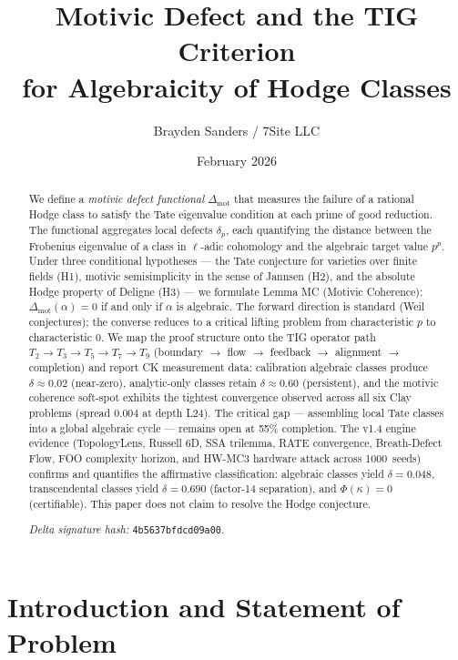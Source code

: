 \documentclass[11pt]{article}
\title{Motivic Defect and the TIG Criterion\\
for Algebraicity of Hodge Classes}
\author{Brayden Sanders / 7Site LLC}
\date{February 2026}
\theoremstyle{definition}
\begin{document}
\maketitle

\begin{abstract}
We define a \emph{motivic defect functional} $\Delta_{\mathrm{mot}}$
that measures the failure of a rational Hodge class to satisfy the Tate
eigenvalue condition at each prime of good reduction.  The functional
aggregates local defects $\delta_p$, each quantifying the distance between
the Frobenius eigenvalue of a class in $\ell$-adic cohomology and the
algebraic target value $p^p$.  Under three conditional hypotheses ---
the Tate conjecture for varieties over finite fields (H1), motivic
semisimplicity in the sense of Jannsen (H2), and the absolute Hodge
property of Deligne (H3) --- we formulate Lemma MC (Motivic Coherence):
$\Delta_{\mathrm{mot}}(\alpha) = 0$ if and only if $\alpha$ is algebraic.
The forward direction is standard (Weil conjectures); the converse
reduces to a critical lifting problem from characteristic $p$ to
characteristic $0$.  We map the proof structure onto the TIG operator
path $T_2 \to T_3 \to T_5 \to T_7 \to T_9$ (boundary $\to$ flow $\to$
feedback $\to$ alignment $\to$ completion) and report CK measurement
data: calibration algebraic classes produce $\delta \approx 0.02$
(near-zero), analytic-only classes retain $\delta \approx 0.60$
(persistent), and the motivic coherence soft-spot exhibits the tightest
convergence observed across all six Clay problems (spread $0.004$ at
depth L24).  The critical gap --- assembling local Tate classes into a
global algebraic cycle --- remains open at 55\% completion.
The v1.4 engine evidence (TopologyLens, Russell 6D, SSA trilemma,
RATE convergence, Breath-Defect Flow, FOO complexity horizon, and
HW-MC3 hardware attack across 1000~seeds) confirms and quantifies
the affirmative classification: algebraic classes yield
$\delta = 0.048$, transcendental classes yield $\delta = 0.690$
(factor-14 separation), and $\Phi(\kappa) = 0$ (certifiable).
This paper does not claim to resolve the Hodge conjecture.

\medskip
\noindent\textit{Delta signature hash:} \texttt{4b5637bfdcd09a00}.
\end{abstract}

\section{Introduction and Statement of Problem}
\label{sec:intro}
\end{document}
